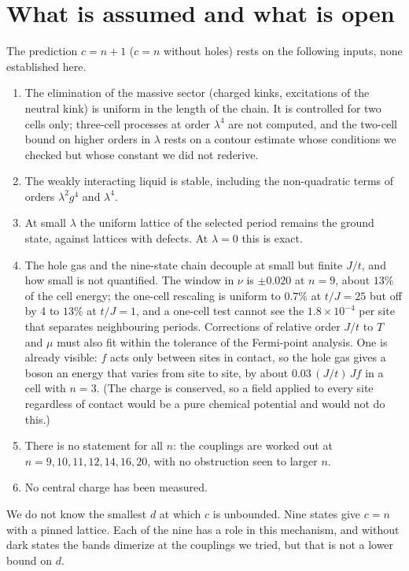 \documentclass[11pt]{article}
\begin{document}
\section{What is assumed and what is open}

The prediction $c=n+1$ ($c=n$ without holes) rests on the following inputs, none established here.
\begin{enumerate}\setlength\itemsep{1pt}
\item The elimination of the massive sector (charged kinks, excitations of the neutral kink) is uniform in the length of the chain. It is controlled for two cells only; three-cell processes at order $\lambda^4$ are not computed, and the two-cell bound on higher orders in $\lambda$ rests on a contour estimate whose conditions we checked but whose constant we did not rederive.
\item The weakly interacting liquid is stable, including the non-quadratic terms of orders $\lambda^2g^4$ and $\lambda^4$.
\item At small $\lambda$ the uniform lattice of the selected period remains the ground state, against lattices with defects. At $\lambda=0$ this is exact.
\item The hole gas and the nine-state chain decouple at small but finite $J/t$, and how small is not quantified. The window in $\nu$ is $\pm0.020$ at $n=9$, about $13\%$ of the cell energy; the one-cell rescaling is uniform to $0.7\%$ at $t/J=25$ but off by 4 to $13\%$ at $t/J=1$, and a one-cell test cannot see the $1.8\times10^{-4}$ per site that separates neighbouring periods. Corrections of relative order $J/t$ to $T$ and $\mu$ must also fit within the tolerance of the Fermi-point analysis. One is already visible: $f$ acts only between sites in contact, so the hole gas gives a boson an energy that varies from site to site, by about $0.03\,(J/t)\,Jf$ in a cell with $n=3$. (The charge is conserved, so a field applied to every site regardless of contact would be a pure chemical potential and would not do this.) %
\item There is no statement for all $n$: the couplings are worked out at $n=9,10,11,12,14,16,20$, with no obstruction seen to larger $n$.
\item No central charge has been measured.
\end{enumerate}

We do not know the smallest $d$ at which $c$ is unbounded. Nine states give $c=n$ with a pinned lattice. Each of the nine has a role in this mechanism, and without dark states the bands dimerize at the couplings we tried, but that is not a lower bound on $d$.
\end{document}
